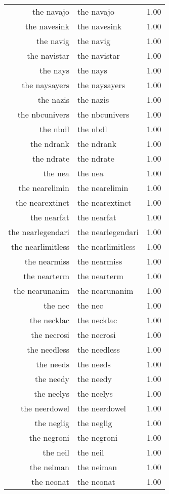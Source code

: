 \begin{table}[ht]
\begin{tabular}{rlr}
  the navajo & the navajo & 1.00 \\ 
  the navesink & the navesink & 1.00 \\ 
  the navig & the navig & 1.00 \\ 
  the navistar & the navistar & 1.00 \\ 
  the nays & the nays & 1.00 \\ 
  the naysayers & the naysayers & 1.00 \\ 
  the nazis & the nazis & 1.00 \\ 
  the nbcunivers & the nbcunivers & 1.00 \\ 
  the nbdl & the nbdl & 1.00 \\ 
  the ndrank & the ndrank & 1.00 \\ 
  the ndrate & the ndrate & 1.00 \\ 
  the nea & the nea & 1.00 \\ 
  the nearelimin & the nearelimin & 1.00 \\ 
  the nearextinct & the nearextinct & 1.00 \\ 
  the nearfat & the nearfat & 1.00 \\ 
  the nearlegendari & the nearlegendari & 1.00 \\ 
  the nearlimitless & the nearlimitless & 1.00 \\ 
  the nearmiss & the nearmiss & 1.00 \\ 
  the nearterm & the nearterm & 1.00 \\ 
  the nearunanim & the nearunanim & 1.00 \\ 
  the nec & the nec & 1.00 \\ 
  the necklac & the necklac & 1.00 \\ 
  the necrosi & the necrosi & 1.00 \\ 
  the needless & the needless & 1.00 \\ 
  the needs & the needs & 1.00 \\ 
  the needy & the needy & 1.00 \\ 
  the neelys & the neelys & 1.00 \\ 
  the neerdowel & the neerdowel & 1.00 \\ 
  the neglig & the neglig & 1.00 \\ 
  the negroni & the negroni & 1.00 \\ 
  the neil & the neil & 1.00 \\ 
  the neiman & the neiman & 1.00 \\ 
  the neonat & the neonat & 1.00 \\ 

\end{tabular}
\end{table}

